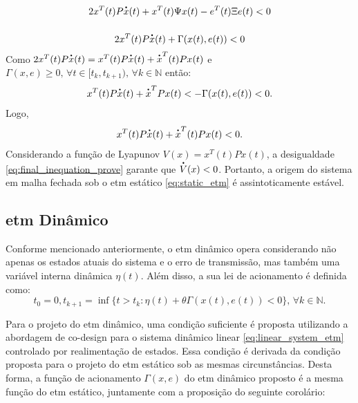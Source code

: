 \begin{gather}
  2x^T(t) P\dt{x}(t) + x^T(t)\Psi x(t) - e^T(t) \Xi e(t)  < 0 \notag \\[12pt]
  2x^T(t) P\dt{x}(t) + \Gamma(x(t), e(t)) < 0
  \label{eq:inequation_prove_4}
\end{gather} Como $2x^T(t) P\dt{x}(t) = x^T(t) P\dt{x}(t) + \dt{x}^T(t) P x(t)$ e $\Gamma(x, e) \geq 0, \, \forall t \in [t_k, t_{k+1}), \, \forall k \in \mathbb{N}$ então: \begin{equation}
  x^T(t) P\dt{x}(t) + \dt{x}^T P x(t)  < - \Gamma(x(t), e(t)) < 0.
\end{equation} Logo, \begin{equation}
  x^T(t) P\dt{x}(t) + \dt{x}^T(t) P x(t) < 0.
  \label{eq:final_inequation_prove}
\end{equation} Considerando a função de Lyapunov $V(x) = x^T(t)Px(t)$, a desigualdade \eqref{eq:final_inequation_prove} garante que $\dt{V}(x) < 0$. Portanto, a origem do sistema em malha fechada sob o \acrshort{etm} estático \eqref{eq:static_etm} é assintoticamente estável.

\subsection{\acrshort{etm} Dinâmico}

Conforme mencionado anteriormente, o \acrshort{etm} dinâmico opera considerando não apenas os estados atuais do sistema e o erro de transmissão, mas também uma variável interna dinâmica $\eta(t)$. Além disso, a sua lei de acionamento é definida como: \begin{equation}
  t_0 = 0, t_{k+1} = \inf \{t > t_k : \eta(t) + \theta \Gamma(x(t), e(t)) < 0 \}, \, \forall k \in \mathbb{N} \label{eq:dynamic_etm}.
\end{equation}

Para o projeto do \acrshort{etm} dinâmico, uma condição suficiente é proposta utilizando a abordagem de co-design para o sistema dinâmico linear \eqref{eq:linear_system_etm} controlado por realimentação de estados. Essa condição é derivada da condição proposta para o projeto do \acrshort{etm} estático sob as mesmas circunstâncias. Desta forma, a função de acionamento $\Gamma(x, e)$ do \acrshort{etm} dinâmico proposto é a mesma função do \acrshort{etm} estático, juntamente com a proposição do seguinte corolário:

